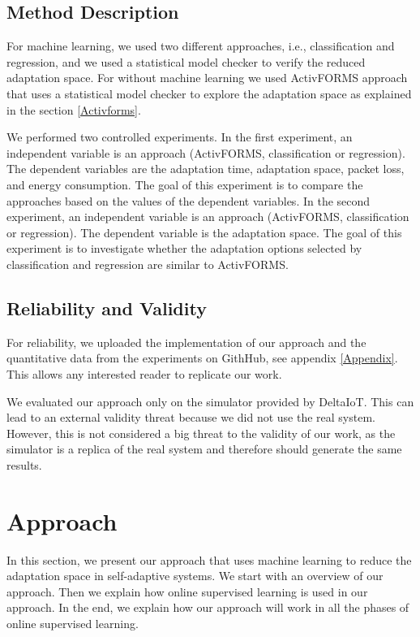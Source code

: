 \documentclass[a4paper,12pt]{article}
\begin{document}
\subsection{Method Description}
For machine learning, we used two different approaches, i.e., classification and regression, and we used a statistical model checker to verify the reduced adaptation space. For without machine learning we used ActivFORMS approach that uses a statistical model checker to explore the adaptation space as explained in the section \ref{Activforms}. 

We performed two controlled experiments. In the first experiment, an independent variable is an approach (ActivFORMS, classification or regression). The dependent variables are the adaptation time, adaptation space, packet loss, and energy consumption. The goal of this experiment is to compare the approaches based on the values of the dependent variables. In the second experiment, an independent variable is an approach (ActivFORMS, classification or regression). The dependent variable is the adaptation space. The goal of this experiment is to investigate whether the adaptation options selected by classification and regression are similar to ActivFORMS.
\subsection{Reliability and Validity}
For reliability, we uploaded the implementation of our approach and the quantitative data from the experiments on GithHub, see appendix \ref{Appendix}. This allows any interested reader to replicate our work.

We evaluated our approach only on the simulator provided by DeltaIoT. This can lead to an external validity threat because we did not use the real system. However, this is not considered a big threat to the validity of our work, as the simulator is a replica of the real system and therefore should generate the same results.
\newpage
\section{Approach} \label{Approach}
In this section, we present our approach that uses machine learning to reduce the adaptation space in self-adaptive systems. We start with an overview of our approach. Then we explain how online supervised learning is used in our approach. In the end, we explain how our approach will work in all the phases of online supervised learning.
\end{document}
